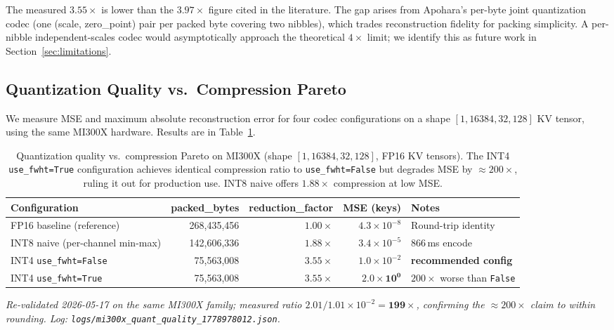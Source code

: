 \documentclass[10pt,twocolumn]{article}
\begin{document}
The measured $3.55\times$ is lower than the $3.97\times$ figure cited in
the literature. The gap arises from Apohara's per-byte joint quantization
codec (one (scale, zero\_point) pair per packed byte covering two nibbles),
which trades reconstruction fidelity for packing simplicity. A per-nibble
independent-scales codec would asymptotically approach the theoretical
$4\times$ limit; we identify this as future work in
Section~\ref{sec:limitations}.

\subsection{Quantization Quality vs.\ Compression Pareto}
\label{sec:eval:quant}

We measure MSE and maximum absolute reconstruction error for four codec
configurations on a shape $[1, 16384, 32, 128]$ KV tensor, using the same
MI300X hardware. Results are in Table~\ref{tab:quant}.

\begin{table}[t]
  \centering
  \small
  \caption{Quantization quality vs.\ compression Pareto on MI300X
           (shape $[1, 16384, 32, 128]$, FP16 KV tensors). The INT4
           \texttt{use\_fwht=True} configuration achieves identical
           compression ratio to \texttt{use\_fwht=False} but degrades
           MSE by $\approx\!200\times$, ruling it out for production
           use. INT8 naive offers $1.88\times$ compression at low MSE.}
  \label{tab:quant}
  \begin{tabular}{@{}lrrrl@{}}
    \toprule
    Configuration & packed\_bytes & reduction\_factor & MSE (keys) & Notes \\
    \midrule
    FP16 baseline (reference)
        & 268,435,456 & $1.00\times$ & $4.3\!\times\!10^{-8}$
        & Round-trip identity \\
    INT8 naive (per-channel min-max)
        & 142,606,336 & $1.88\times$ & $3.4\!\times\!10^{-5}$
        & 866\,ms encode \\
    INT4 \texttt{use\_fwht=False}
        & 75,563,008  & $3.55\times$ & $1.0\!\times\!10^{-2}$
        & \textbf{recommended config} \\
    INT4 \texttt{use\_fwht=True}
        & 75,563,008  & $3.55\times$ & $\mathbf{2.0\!\times\!10^{0}}$
        & $200\times$ worse than \texttt{False} \\
    \bottomrule
  \end{tabular}
  \par\vspace{2pt}
  \footnotesize\emph{Re-validated 2026-05-17 on the same MI300X
    family; measured ratio $2.01 / 1.01\!\times\!10^{-2} =
    \mathbf{199\times}$, confirming the
    $\approx\!200\times$ claim to within rounding. Log:
    \texttt{logs/mi300x\_quant\_quality\_1778978012.json}.}
\end{table}
\end{document}
